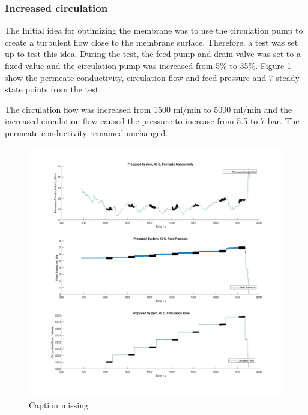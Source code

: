 \newpage
\subsubsection{Increased circulation}

The Initial idea for optimizing the membrane was to use the circulation pump to create a turbulent flow close to the membrane surface. Therefore, a test was set up to test this idea.
During the test, the feed pump and drain valve was set to a fixed value and the circulation pump was increased from 5\% to 35\%. Figure \ref{fig:RecIncrease} show the permeate conductivity, circulation flow and feed pressure and 7 steady state points from the test.

The circulation flow was increased from 1500 ml/min to 5000 ml/min and the increased circulation flow caused the pressure to increase from 5.5 to 7 bar. The permeate conductivity remained unchanged. 
\begin{figure}[H]
    \centering
    \includegraphics[width=1.1\textwidth]{RecIncrease40}
    \caption{Caption missing}
    \label{fig:RecIncrease}
\end{figure}  

